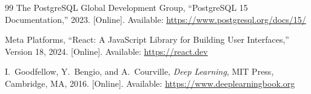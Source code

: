 \documentclass[conference]{IEEEtran}
\begin{document}
\begin{thebibliography}{99}
The PostgreSQL Global Development Group,
``PostgreSQL 15 Documentation,''
2023. [Online]. Available: \url{https://www.postgresql.org/docs/15/}

Meta Platforms, ``React: A JavaScript Library for Building User Interfaces,''
Version 18, 2024. [Online]. Available: \url{https://react.dev}

I.\ Goodfellow, Y.\ Bengio, and A.\ Courville,
\textit{Deep Learning},
MIT Press, Cambridge, MA, 2016. [Online]. Available: \url{https://www.deeplearningbook.org}

\end{thebibliography}
\end{document}
